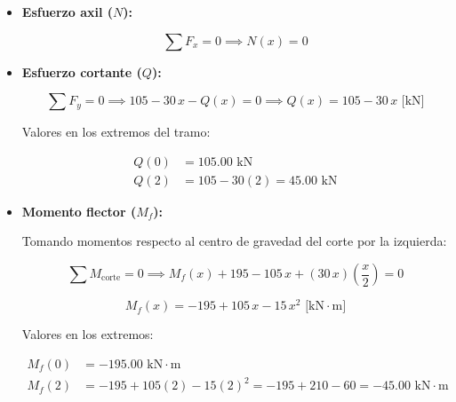 \begin{itemize}

    \item \textbf{Esfuerzo axil ($N$):}

          \begin{equation}

              \sum F_x = 0 \implies \boxed{N(x) = 0}

          \end{equation}

    \item \textbf{Esfuerzo cortante ($Q$):}

          \begin{equation}

              \sum F_y = 0 \implies 105 - 30\,x - Q(x) = 0 \implies \boxed{Q(x) = 105 - 30\,x\text{ [kN]}}

          \end{equation}

          Valores en los extremos del tramo:

          \begin{align*}

              Q(0) & = 105.00\text{ kN}              \\

              Q(2) & = 105 - 30(2) = 45.00\text{ kN}

          \end{align*}

    \item \textbf{Momento flector ($M_f$):}

          Tomando momentos respecto al centro de gravedad del corte por la izquierda:

          \begin{equation}

              \sum M_{\text{corte}} = 0 \implies M_f(x) + 195 - 105\,x + (30\,x)\left(\frac{x}{2}\right) = 0

          \end{equation}

          \begin{equation}

              \boxed{M_f(x) = -195 + 105\,x - 15\,x^2\text{ [kN}\cdot\text{m]}}

          \end{equation}

          Valores en los extremos:

          \begin{align*}

              M_f(0) & = -195.00\text{ kN}\cdot\text{m}                                            \\

              M_f(2) & = -195 + 105(2) - 15(2)^2 = -195 + 210 - 60 = -45.00\text{ kN}\cdot\text{m}

          \end{align*}

\end{itemize}



